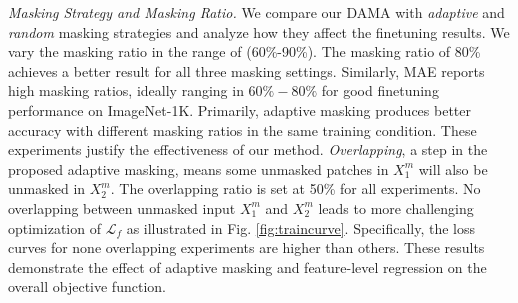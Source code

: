 \documentclass[10pt,twocolumn,letterpaper]{article}
\begin{document}
\textcolor{nblue}{\textit{Masking Strategy and Masking Ratio.}} We compare our DAMA with \textit{adaptive} and \textit{random} masking strategies and analyze how they affect the finetuning results. We vary the masking ratio in the range of (60\%-90\%). The masking ratio of 80\% achieves a better result for all three masking settings. Similarly, MAE reports high masking ratios, ideally ranging in $60\%-80\%$ for good finetuning performance on ImageNet-1K. Primarily, adaptive masking produces better accuracy with different masking ratios in the same training condition. These experiments justify the effectiveness of our method. \textit{Overlapping}, a step in the proposed adaptive masking, means some unmasked patches in $X_1^m$ will also be unmasked in $X_2^m$. The overlapping ratio is set at 50\% for all experiments. No overlapping between unmasked input $X_1^m$ and $X_2^m$ leads to more challenging optimization of $\mathcal L_{f}$ as illustrated in Fig. \ref{fig:traincurve}. Specifically, the loss curves for none overlapping experiments are higher than others. These results demonstrate the effect of adaptive masking and feature-level regression on the overall objective function. 
\end{document}
